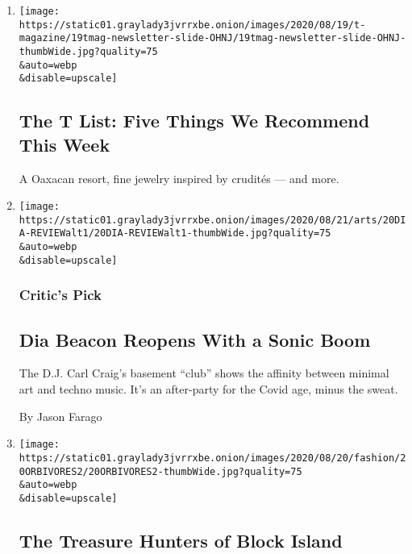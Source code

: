 \begin{enumerate}
\def\labelenumi{\arabic{enumi}.}
\item
  \href{/2020/08/20/t-magazine/monte-uzulu-vivanterre-emme-parsons.html}{}

  \texttt{[image: https://static01.graylady3jvrrxbe.onion/images/2020/08/19/t-magazine/19tmag-newsletter-slide-OHNJ/19tmag-newsletter-slide-OHNJ-thumbWide.jpg?quality=75\\\&auto=webp\\\&disable=upscale]}

  \hypertarget{the-t-list-five-things-we-recommend-this-week}{%
  \subsection{The T List: Five Things We Recommend This
  Week}\label{the-t-list-five-things-we-recommend-this-week}}

  A Oaxacan resort, fine jewelry inspired by crudités --- and more.
\item
  \href{/2020/08/20/arts/design/dia-beacon-reopen-coronavirus.html}{}

  \texttt{[image: https://static01.graylady3jvrrxbe.onion/images/2020/08/21/arts/20DIA-REVIEWalt1/20DIA-REVIEWalt1-thumbWide.jpg?quality=75\\\&auto=webp\\\&disable=upscale]}

  \hypertarget{critics-pick}{%
  \subsubsection{Critic's Pick}\label{critics-pick}}

  \hypertarget{dia-beacon-reopens-with-a-sonic-boom}{%
  \subsection{Dia Beacon Reopens With a Sonic
  Boom}\label{dia-beacon-reopens-with-a-sonic-boom}}

  The D.J. Carl Craig's basement ``club'' shows the affinity between
  minimal art and techno music. It's an after-party for the Covid age,
  minus the sweat.

  By Jason Farago
\item
  \href{/2020/08/20/style/orbivores-block-island.html}{}

  \texttt{[image: https://static01.graylady3jvrrxbe.onion/images/2020/08/20/fashion/20ORBIVORES2/20ORBIVORES2-thumbWide.jpg?quality=75\\\&auto=webp\\\&disable=upscale]}

  \hypertarget{the-treasure-hunters-of-block-island}{%
  \subsection{The Treasure Hunters of Block
  Island}\label{the-treasure-hunters-of-block-island}}


\end{enumerate}
